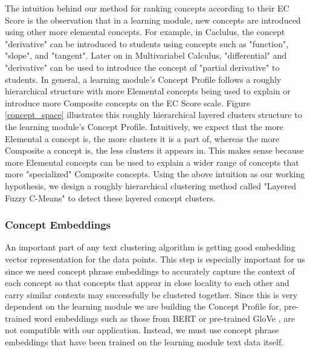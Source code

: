 

The intuition behind our method for ranking concepts according to their EC Score is the observation that in a learning module, new concepts are introduced using other more elemental concepts. For example, in Caclulus, the concept "derivative" can be introduced to students using concepts such as "function", "slope", and "tangent". Later on in Multivariabel Calculus, "differential" and "derivative" can be used to introduce the concept of "partial derivative" to students. In general, a learning module's Concept Profile follows a roughly hierarchical structure with more Elemental concepts being used to explain or introduce more Composite concepts on the EC Score scale. Figure \ref{concept_space} illustrates this roughly hierarchical layered clusters structure to the learning module's Concept Profile. Intuitively, we expect that the more Elemental a concept is, the more clusters it is a part of, whereas the more Composite a concept is, the less clusters it appears in. This makes sense because more Elemental concepts can be used to explain a wider range of concepts that more "specialized" Composite concepts. Using the above intuition as our working hypothesis, we design a roughly hierarchical clustering method called "Layered Fuzzy C-Means" to detect these layered concept clusters.

\subsubsection{Concept Embeddings}
An important part of any text clustering algorithm is getting good embedding vector representation for the data points. This step is especially important for us since we need concept phrase embeddings to accurately capture the context of each concept so that concepts that appear in close locality to each other and carry similar contexts may successfully be clustered together. Since this is very dependent on the learning module we are building the Concept Profile for, pre-trained word embeddings such as those from BERT \cite{} or pre-trained GloVe \cite{}, are not compatible with our application. Instead, we must use concept phrase embeddings that have been trained on the learning module text data itself.

